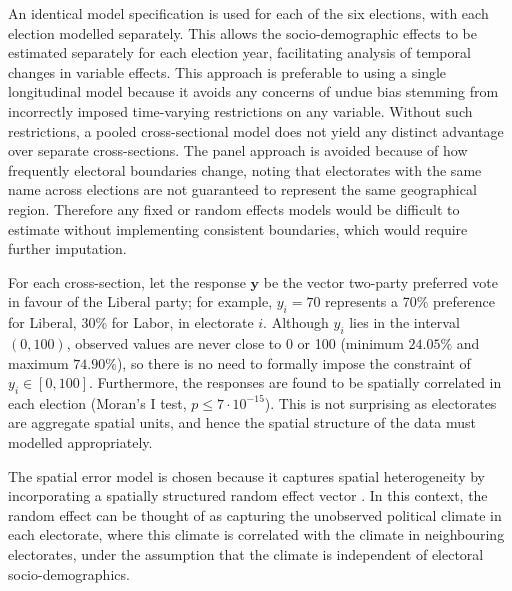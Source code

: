 \documentclass[11pt,a4paper,]{article}
\begin{document}
An identical model specification is used for each of the six elections,
with each election modelled separately. This allows the
socio-demographic effects to be estimated separately for each election
year, facilitating analysis of temporal changes in variable effects.
This approach is preferable to using a single longitudinal model because
it avoids any concerns of undue bias stemming from incorrectly imposed
time-varying restrictions on any variable. Without such restrictions, a
pooled cross-sectional model does not yield any distinct advantage over
separate cross-sections. The panel approach is avoided because of how
frequently electoral boundaries change, noting that electorates with the
same name across elections are not guaranteed to represent the same
geographical region. Therefore any fixed or random effects models would
be difficult to estimate without implementing consistent boundaries,
which would require further imputation.

For each cross-section, let the response \(\bm{y}\) be the vector
two-party preferred vote in favour of the Liberal party; for example,
\(y_i = 70\) represents a 70\% preference for Liberal, 30\% for Labor,
in electorate \(i\). Although \(y_i\) lies in the interval \((0,100)\),
observed values are never close to 0 or 100 (minimum \(24.05 \%\) and
maximum \(74.90 \%\)), so there is no need to formally impose the
constraint of \(y_i \in [0,100]\). Furthermore, the responses are found
to be spatially correlated in each election (Moran's I test,
\(p \le 7\cdot10^{-15}\)). This is not surprising as electorates are
aggregate spatial units, and hence the spatial structure of the data
must modelled appropriately.

The spatial error model \autocite{Anselin88} is chosen because it
captures spatial heterogeneity by incorporating a spatially structured
random effect vector \autocite{LeSage2009}. In this context, the random
effect can be thought of as capturing the unobserved political climate
in each electorate, where this climate is correlated with the climate in
neighbouring electorates, under the assumption that the climate is
independent of electoral socio-demographics.
\end{document}
